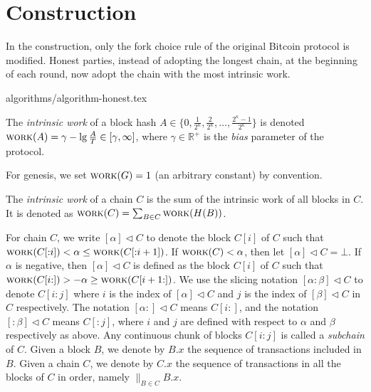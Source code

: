 \section{Construction}\label{sec:construction}
In the \poem construction, only the fork choice rule
of the original Bitcoin protocol is modified.
Honest parties, instead of adopting the longest chain, at the beginning
of each round, now adopt the chain with the most intrinsic work.

{algorithms/algorithm-honest.tex}

\begin{definition}\label{def:quantized-block-work}
  The \emph{intrinsic work} of a block hash
  $A \in \{0, \frac{1}{2^\kappa}, \frac{2}{2^\kappa}, \ldots, \frac{2^\kappa - 1}{2^\kappa}\}$
  is denoted $\textsc{work}(A) = \gamma - \lg \frac{A}{T} \in [\gamma, \infty]$,
  where $\gamma \in \mathbb{R}^+$
  is the \emph{bias} parameter of the protocol.
\end{definition}

For genesis, we set $\textsc{work}(G) = 1$ (an arbitrary constant) by convention.

\begin{definition}
  The \emph{intrinsic work} of a chain
  $C$ is the sum of the
  intrinsic work of all blocks in $C$.
  It is denoted as $\textsc{work}(C) = \sum_{B \in C}{\textsc{work}(H(B))}$.
\end{definition}

\noindent
{}
For chain $C$, we write $[\alpha] \lhd C$
to denote the block $C[i]$ of $C$ such that
$\textsc{work}(C[{:}{i}]) < \alpha \leq \textsc{work}(C[{:}{i + 1}])$.
If $\textsc{work}(C) < \alpha$, then let $[\alpha] \lhd C = \bot$.
If $\alpha$ is negative, then $[\alpha] \lhd C$ is defined as
the block $C[i]$ of $C$ such that
$\textsc{work}(C[{i}{:}]) > -\alpha \geq \textsc{work}(C[{i + 1}{:}])$.
We use the slicing notation $[{\alpha}{:}{\beta}] \lhd C$ to denote
$C[{i}{:}{j}]$ where $i$ is the index of $[\alpha] \lhd C$
and $j$ is the index of $[\beta] \lhd C$ in $C$ respectively.
The notation $[{\alpha}{:}] \lhd C$ means $C[{i}{:}]$,
and the notation $[{:}\beta] \lhd C$ means $C[{:}{j}]$,
where $i$ and $j$ are defined with respect to $\alpha$ and $\beta$
respectively as above.
Any continuous chunk of blocks $C[{i}{:}{j}]$ is called a \emph{subchain} of $C$.
Given a block $B$, we denote by $B.x$ the sequence of transactions
included in $B$.
Given a chain $C$, we denote by $C.x$
the sequence of transactions in all the blocks of $C$ in order, namely
${\big\lVert}_{B \in C} B.x$.

